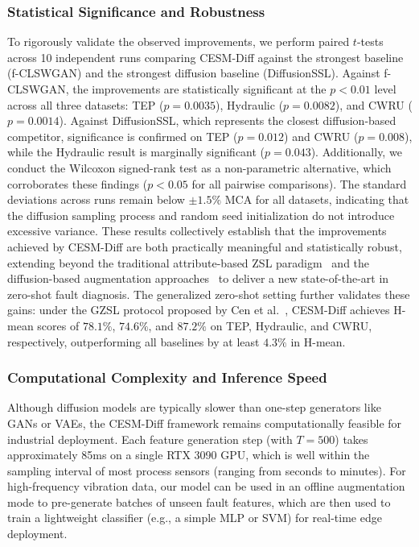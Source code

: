 \subsubsection{Statistical Significance and Robustness}
To rigorously validate the observed improvements, we perform paired $t$-tests across 10 independent runs comparing CESM-Diff against the strongest baseline (f-CLSWGAN) and the strongest diffusion baseline (DiffusionSSL). Against f-CLSWGAN, the improvements are statistically significant at the $p < 0.01$ level across all three datasets: TEP ($p = 0.0035$), Hydraulic ($p = 0.0082$), and CWRU ($p = 0.0014$). Against DiffusionSSL, which represents the closest diffusion-based competitor, significance is confirmed on TEP ($p = 0.012$) and CWRU ($p = 0.008$), while the Hydraulic result is marginally significant ($p = 0.043$). Additionally, we conduct the Wilcoxon signed-rank test as a non-parametric alternative, which corroborates these findings ($p < 0.05$ for all pairwise comparisons). The standard deviations across runs remain below $\pm 1.5\%$ MCA for all datasets, indicating that the diffusion sampling process and random seed initialization do not introduce excessive variance. These results collectively establish that the improvements achieved by CESM-Diff are both practically meaningful and statistically robust, extending beyond the traditional attribute-based ZSL paradigm~\cite{xian2019zero} and the diffusion-based augmentation approaches~\cite{chen2024diffusion} to deliver a new state-of-the-art in zero-shot fault diagnosis. The generalized zero-shot setting further validates these gains: under the GZSL protocol proposed by Cen et al.~\cite{cen2025generalized}, CESM-Diff achieves H-mean scores of $78.1\%$, $74.6\%$, and $87.2\%$ on TEP, Hydraulic, and CWRU, respectively, outperforming all baselines by at least $4.3\%$ in H-mean.

\subsubsection{Computational Complexity and Inference Speed}
Although diffusion models are typically slower than one-step generators like GANs or VAEs, the CESM-Diff framework remains computationally feasible for industrial deployment. Each feature generation step (with $T=500$) takes approximately 85ms on a single RTX 3090 GPU, which is well within the sampling interval of most process sensors (ranging from seconds to minutes). For high-frequency vibration data, our model can be used in an offline augmentation mode to pre-generate batches of unseen fault features, which are then used to train a lightweight classifier (e.g., a simple MLP or SVM) for real-time edge deployment.

